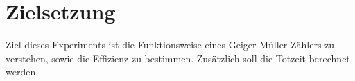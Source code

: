\section{Zielsetzung}
\label{sec:Zielsetzung}


Ziel dieses Experiments ist die Funktionsweise eines Geiger-Müller Zählers zu verstehen, sowie die Effizienz zu bestimmen. Zusätzlich soll die Totzeit berechnet werden.